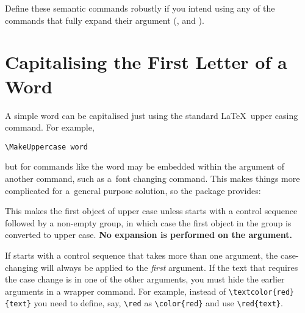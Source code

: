 \documentclass[report]{nlctdoc}
\begin{document}
Define these semantic commands robustly if you intend using
any of the commands that fully expand their argument
(,  and
).

\chapter{Capitalising the First Letter of a Word}
\label{sec:makefirstuc}

A simple word can be capitalised just using the standard \LaTeX\
upper casing command. For example,
\begin{verbatim}
\MakeUppercase word
\end{verbatim}
but for commands like  the word may be embedded within the
argument of another command, such as a~font changing command. This
makes things more complicated for a~general purpose solution, so
the \styfmt{mfirstuc} package provides:
\begin{definition}[\DescribeMacro{\makefirstuc}]
\end{definition}
This makes the first object of
 upper case unless  starts with a control
sequence followed by a non-empty group, in which case the first
object in the group is converted to upper case.
\textbf{No expansion is performed on the argument.}

\begin{important}
If  starts with a control sequence that takes more than
one argument, the case-changing will always be applied to the
\emph{first} argument. If the text that requires the case change is
in one of the other arguments, you must hide the earlier arguments
in a wrapper command. For example, instead of \verb|\textcolor{red}{text}|
you need to define, say, \verb|\red| as \verb|\color{red}| and use
\verb|\red{text}|.
\end{important}
\end{document}
